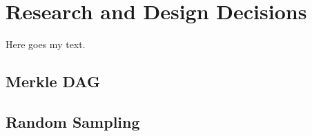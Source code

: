 \section{Research and Design Decisions}

Here goes my text.

\subsection{Merkle DAG}
\subsection{Random Sampling}